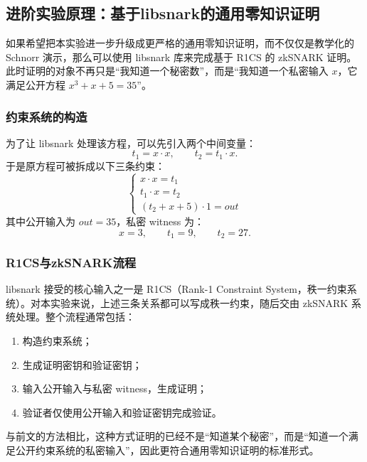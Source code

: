 \documentclass[a4paper]{article}
\begin{document}
\subsection{进阶实验原理：基于libsnark的通用零知识证明}
如果希望把本实验进一步升级成更严格的通用零知识证明，而不仅仅是教学化的 Schnorr 演示，那么可以使用 libsnark 库来完成基于 R1CS 的 zkSNARK 证明。此时证明的对象不再只是“我知道一个秘密数”，而是“我知道一个私密输入 $x$，它满足公开方程 $x^3+x+5=35$”。

\subsubsection{约束系统的构造}
为了让 libsnark 处理该方程，可以先引入两个中间变量：
\[
t_1=x\cdot x,\qquad t_2=t_1\cdot x.
\]
于是原方程可被拆成以下三条约束：
\[
\begin{cases}
x \cdot x = t_1 \\
t_1 \cdot x = t_2 \\
(t_2 + x + 5)\cdot 1 = out
\end{cases}
\]
其中公开输入为 $out=35$，私密 witness 为：
\[
x=3,\qquad t_1=9,\qquad t_2=27.
\]

\subsubsection{R1CS与zkSNARK流程}
libsnark 接受的核心输入之一是 R1CS（Rank-1 Constraint System，秩一约束系统）。对本实验来说，上述三条关系都可以写成秩一约束，随后交由 zkSNARK 系统处理。整个流程通常包括：
\begin{enumerate}
    \item 构造约束系统；
    \item 生成证明密钥和验证密钥；
    \item 输入公开输入与私密 witness，生成证明；
    \item 验证者仅使用公开输入和验证密钥完成验证。
\end{enumerate}
与前文的方法相比，这种方式证明的已经不是“知道某个秘密”，而是“知道一个满足公开约束系统的私密输入”，因此更符合通用零知识证明的标准形式\cite{Libsnark}。

\end{document}
